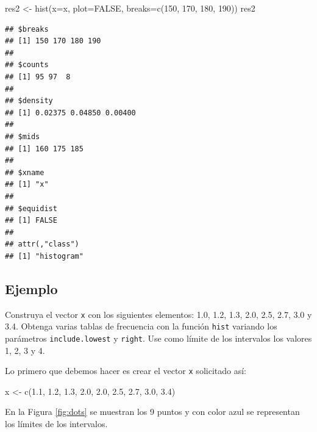 \documentclass[
]{book}
\makeatletter
\newenvironment{Shaded}{\begin{snugshade}}{\end{snugshade}}
\newcommand{\AttributeTok}[1]{\textcolor[rgb]{0.77,0.63,0.00}{#1}}
\newcommand{\ConstantTok}[1]{\textcolor[rgb]{0.00,0.00,0.00}{#1}}
\newcommand{\DecValTok}[1]{\textcolor[rgb]{0.00,0.00,0.81}{#1}}
\newcommand{\FloatTok}[1]{\textcolor[rgb]{0.00,0.00,0.81}{#1}}
\newcommand{\FunctionTok}[1]{\textcolor[rgb]{0.00,0.00,0.00}{#1}}
\newcommand{\NormalTok}[1]{#1}
\newcommand{\OtherTok}[1]{\textcolor[rgb]{0.56,0.35,0.01}{#1}}
\newenvironment{kframe}{%
\medskip{}
\setlength{\fboxsep}{.8em}
 \def\at@end@of@kframe{}%
 \ifinner\ifhmode%
  \def\at@end@of@kframe{\end{minipage}}%
  \begin{minipage}{\columnwidth}%
 \fi\fi%
 \def\FrameCommand##1{\hskip\@totalleftmargin \hskip-\fboxsep
 \colorbox{shadecolor}{##1}\hskip-\fboxsep
     \hskip-\linewidth \hskip-\@totalleftmargin \hskip\columnwidth}%
 \MakeFramed {\advance\hsize-\width
   \@totalleftmargin\z@ \linewidth\hsize
   \@setminipage}}%
 {\par\unskip\endMakeFramed%
 \at@end@of@kframe}
\renewenvironment{Shaded}{\begin{kframe}}{\end{kframe}}
\makeatother
\begin{document}
\begin{Shaded}
\begin{Highlighting}[]
\NormalTok{res2 }\OtherTok{\textless{}{-}} \FunctionTok{hist}\NormalTok{(}\AttributeTok{x=}\NormalTok{x, }\AttributeTok{plot=}\ConstantTok{FALSE}\NormalTok{, }
             \AttributeTok{breaks=}\FunctionTok{c}\NormalTok{(}\DecValTok{150}\NormalTok{, }\DecValTok{170}\NormalTok{, }\DecValTok{180}\NormalTok{, }\DecValTok{190}\NormalTok{))}
\NormalTok{res2}
\end{Highlighting}
\end{Shaded}

\begin{verbatim}
## $breaks
## [1] 150 170 180 190
## 
## $counts
## [1] 95 97  8
## 
## $density
## [1] 0.02375 0.04850 0.00400
## 
## $mids
## [1] 160 175 185
## 
## $xname
## [1] "x"
## 
## $equidist
## [1] FALSE
## 
## attr(,"class")
## [1] "histogram"
\end{verbatim}

\hypertarget{ejemplo-29}{%
\subsection*{Ejemplo}\label{ejemplo-29}}

Construya el vector \texttt{x} con los siguientes elementos: 1.0, 1.2, 1.3, 2.0, 2.5, 2.7, 3.0 y 3.4. Obtenga varias tablas de frecuencia con la función \texttt{hist} variando los parámetros \texttt{include.lowest} y \texttt{right}. Use como límite de los intervalos los valores 1, 2, 3 y 4.

Lo primero que debemos hacer es crear el vector \texttt{x} solicitado así:

\begin{Shaded}
\begin{Highlighting}[]
\NormalTok{x }\OtherTok{\textless{}{-}} \FunctionTok{c}\NormalTok{(}\FloatTok{1.1}\NormalTok{, }\FloatTok{1.2}\NormalTok{, }\FloatTok{1.3}\NormalTok{, }\FloatTok{2.0}\NormalTok{, }\FloatTok{2.0}\NormalTok{, }\FloatTok{2.5}\NormalTok{, }\FloatTok{2.7}\NormalTok{, }\FloatTok{3.0}\NormalTok{, }\FloatTok{3.4}\NormalTok{)}
\end{Highlighting}
\end{Shaded}

En la Figura \ref{fig:dots} se muestran los 9 puntos y con color azul se representan los límites de los intervalos.
\end{document}
